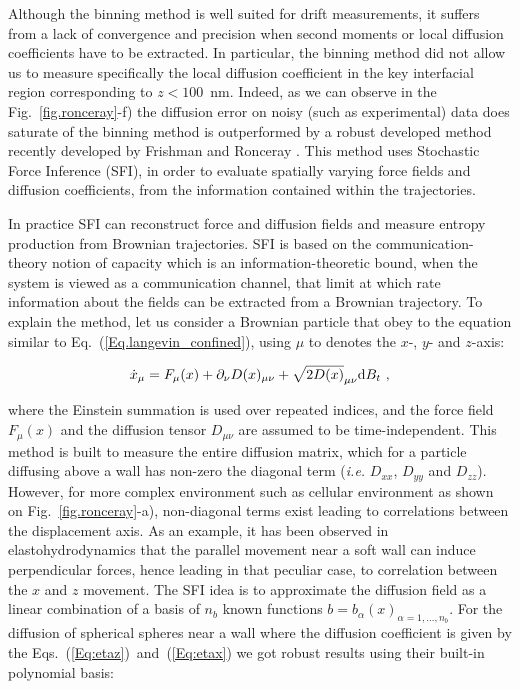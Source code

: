 Although the binning method is well suited for drift measurements, it suffers from a lack of convergence and precision when second moments or local diffusion coefficients have to be extracted. In particular, the binning method did not allow us to measure specifically the local diffusion coefficient in the key interfacial region corresponding to $z<100$~nm. Indeed, as we can observe in the Fig.~\ref{fig.ronceray}-f) the diffusion error on noisy (such as experimental) data does saturate of the binning method is outperformed by a robust developed method  recently developed by Frishman and Ronceray \cite{frishman_learning_2020}. This method uses Stochastic Force Inference (\gls{SFI}), in order to evaluate spatially varying force fields and diffusion coefficients, from the information contained within the trajectories. 

In practice \gls{SFI} can reconstruct force and diffusion fields and measure entropy production from Brownian trajectories. \gls{SFI} is based on the communication-theory notion of capacity which is an information-theoretic bound, when the system is viewed as a communication channel, that limit at which rate information about the fields can be extracted from a Brownian trajectory. To explain the method, let us consider a Brownian particle that obey to the equation similar to Eq.~(\ref{Eq.langevin_confined}), using $\mu$ to denotes the $x$-, $y$- and $z$-axis:

\begin{equation}
	\dot{x}_\mu = F_\mu (x) + \partial_\nu D(x)_{\mu \nu} + \sqrt{2D(x)}_{\mu \nu} \textnormal{d}B_t~,
\end{equation}

where the Einstein summation is used over repeated indices, and the force field $F_\mu (x)$ and the diffusion tensor $D_{\mu \nu}$ are assumed to be time-independent. This method is built to measure the entire diffusion matrix, which for a particle diffusing above a wall has non-zero the diagonal term (\textit{i.e.} $D_{xx}$, $D_{yy}$ and $D_{zz}$). However, for more complex environment such as cellular environment as shown on Fig.~\ref{fig.ronceray}-a), non-diagonal terms exist leading to correlations between the displacement axis. As an example, it has been observed in elastohydrodynamics \cite{saintyves_self-sustained_2016} that the parallel movement near a soft wall can induce perpendicular forces, hence leading in that peculiar case, to correlation between the $x$ and $z$ movement. The \gls{SFI} idea is to approximate the diffusion field as a linear combination of a basis of $n_b$ known functions $b={b_\alpha (x)}_{\alpha = 1,...,n_b}$. For the diffusion of spherical spheres near a wall where the diffusion coefficient is given by the Eqs.~(\ref{Eq:etaz})~and~(\ref{Eq:etax}) we got robust results using their built-in polynomial basis:

